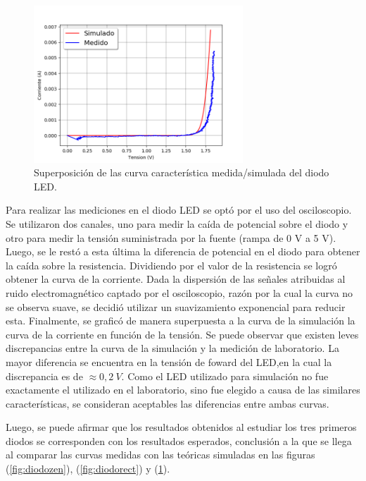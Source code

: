 \documentclass[a4paper]{article}
\begin{document}
\begin{figure}[H]
	\centering
	\includegraphics[width=0.7\textwidth]{CurvaDiodosLed.png}
	\caption{Superposición de las curva característica medida/simulada del diodo LED.}
	\label{fig:diodoled}
\end{figure}

Para realizar las mediciones en el diodo LED se optó por el uso del osciloscopio. Se utilizaron dos canales, uno para medir la caída de potencial sobre el diodo y otro para medir la tensión suministrada por la fuente (rampa de 0 V a 5 V). Luego, se le restó a esta última la diferencia de potencial en el diodo para obtener la caída sobre la resistencia. Dividiendo por el valor de la resistencia se logró obtener la curva de la corriente. Dada la dispersión de las señales atribuidas al ruido electromagnético captado por el osciloscopio, razón por la cual la curva no se observa suave, se decidió utilizar un suavizamiento exponencial para reducir esta. Finalmente, se graficó de manera superpuesta a la curva de la simulación la curva de la corriente en función de la tensión.
Se puede observar que existen leves discrepancias entre la curva de la simulación y la medición de laboratorio. La mayor diferencia se encuentra en la tensión de foward del LED,en  la cual la discrepancia es de $\approx 0,2 \ V$.
Como el LED utilizado para simulación no fue exactamente el utilizado en el laboratorio, sino fue elegido a causa de las similares características, se consideran aceptables las diferencias entre ambas curvas.

Luego, se puede afirmar que los resultados obtenidos al estudiar los tres primeros diodos se corresponden con los resultados esperados, conclusión a la que se llega al comparar las curvas medidas con las teóricas simuladas en las figuras (\ref{fig:diodozen}), (\ref{fig:diodorect}) y (\ref{fig:diodoled}).
\end{document}
